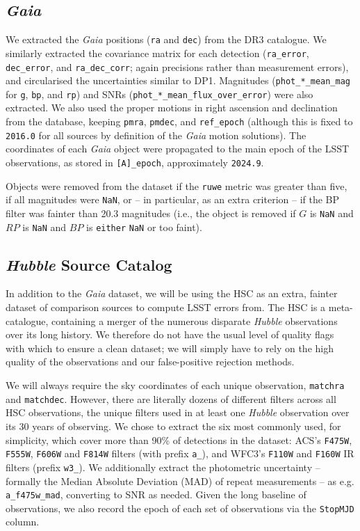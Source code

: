 \documentclass[SE,lsstdraft,authoryear,toc]{lsstdoc}
\begin{document}
\subsection{\textit{Gaia}}
We extracted the \textit{Gaia} positions (\texttt{ra} and \texttt{dec}) from the DR3 catalogue.
We similarly extracted the covariance matrix for each detection (\texttt{ra\_error}, \texttt{dec\_error}, and \texttt{ra\_dec\_corr}; again precisions rather than measurement errors), and circularised the uncertainties similar to DP1.
Magnitudes (\texttt{phot\_*\_mean\_mag} for \texttt{g}, \texttt{bp}, and \texttt{rp}) and SNRs (\texttt{phot\_*\_mean\_flux\_over\_error}) were also extracted.
We also used the proper motions in right ascension and declination from the database, keeping \texttt{pmra}, \texttt{pmdec}, and \texttt{ref\_epoch} (although this is fixed to \texttt{2016.0} for all sources by definition of the \textit{Gaia} motion solutions).
The coordinates of each \textit{Gaia} object were propagated to the main epoch of the LSST observations, as stored in \texttt{[A]\_epoch}, approximately \texttt{2024.9}.

Objects were removed from the dataset if the \texttt{ruwe} metric was greater than five, if all magnitudes were \texttt{NaN}, or -- in particular, as an extra criterion -- if the BP filter was fainter than 20.3 magnitudes (i.e., the object is removed if $G$ is \texttt{NaN} and $RP$ is \texttt{NaN} and $BP$ is \texttt{either} \texttt{NaN} or too faint).

\subsection{\textit{Hubble} Source Catalog}
In addition to the \textit{Gaia} dataset, we will be using the HSC as an extra, fainter dataset of comparison sources to compute LSST errors from.
The HSC is a meta-catalogue, containing a merger of the numerous disparate \textit{Hubble} observations over its long history.
We therefore do not have the usual level of quality flags with which to ensure a clean dataset; we will simply have to rely on the high quality of the observations and our false-positive rejection methods.

We will always require the sky coordinates of each unique observation, \texttt{matchra} and \texttt{matchdec}.
However, there are literally dozens of different filters across all HSC observations, the unique filters used in at least one \textit{Hubble} observation over its 30 years of observing.
We chose to extract the six most commonly used, for simplicity, which cover more than 90\% of detections in the dataset: ACS's \texttt{F475W}, \texttt{F555W}, \texttt{F606W} and \texttt{F814W} filters (with prefix \texttt{a\_}), and WFC3's \texttt{F110W} and \texttt{F160W} IR filters (prefix \texttt{w3\_}).
We additionally extract the photometric uncertainty -- formally the Median Absolute Deviation (MAD) of repeat measurements -- as e.g. \texttt{a\_f475w\_mad}, converting to SNR as needed.
Given the long baseline of observations, we also record the epoch of each set of observations via the \texttt{StopMJD} column.
\end{document}
